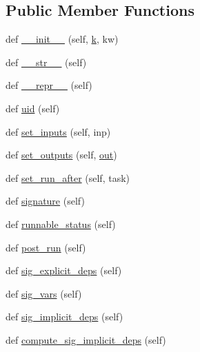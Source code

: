 \subsection*{Public Member Functions}
\begin{DoxyCompactItemize}
\item 
def \hyperlink{classwaflib_1_1_task_1_1_task_a566ab609bec4499aeab7bcd6f77f156e}{\+\_\+\+\_\+init\+\_\+\+\_\+} (self, \hyperlink{rfft2d_test_m_l_8m_adc468c70fb574ebd07287b38d0d0676d}{k}, kw)
\item 
def \hyperlink{classwaflib_1_1_task_1_1_task_a2507ae71718d699910a9dd8708664630}{\+\_\+\+\_\+str\+\_\+\+\_\+} (self)
\item 
def \hyperlink{classwaflib_1_1_task_1_1_task_ac05a045661750df307593224089759da}{\+\_\+\+\_\+repr\+\_\+\+\_\+} (self)
\item 
def \hyperlink{classwaflib_1_1_task_1_1_task_a910c51ea67c1c47ac40690bbba73b76a}{uid} (self)
\item 
def \hyperlink{classwaflib_1_1_task_1_1_task_a647c971bbca84d07daeff8d24f70ea18}{set\+\_\+inputs} (self, inp)
\item 
def \hyperlink{classwaflib_1_1_task_1_1_task_a8e650ed64c8370720574ebd8481a4f48}{set\+\_\+outputs} (self, \hyperlink{latency_8c_a71fd1c281affec034757279e4f91c50b}{out})
\item 
def \hyperlink{classwaflib_1_1_task_1_1_task_a84292828c5a6cf3282027ed8ce5c7822}{set\+\_\+run\+\_\+after} (self, task)
\item 
def \hyperlink{classwaflib_1_1_task_1_1_task_a48e55f13de8172b779a4e63794c7f44f}{signature} (self)
\item 
def \hyperlink{classwaflib_1_1_task_1_1_task_a2a281aaea77a0732f72103cfe4bc56c4}{runnable\+\_\+status} (self)
\item 
def \hyperlink{classwaflib_1_1_task_1_1_task_ac7c2e0bf22acd7d96399b1ca7f342232}{post\+\_\+run} (self)
\item 
def \hyperlink{classwaflib_1_1_task_1_1_task_a76a53025fb59fd6096f988ff64481070}{sig\+\_\+explicit\+\_\+deps} (self)
\item 
def \hyperlink{classwaflib_1_1_task_1_1_task_acffd01af005b390787b85239ac207282}{sig\+\_\+vars} (self)
\item 
def \hyperlink{classwaflib_1_1_task_1_1_task_a60ce159ef323481b09fcea4decb9e231}{sig\+\_\+implicit\+\_\+deps} (self)
\item 
def \hyperlink{classwaflib_1_1_task_1_1_task_adf3f63ea77fbca592ebc4244ba57887d}{compute\+\_\+sig\+\_\+implicit\+\_\+deps} (self)

\end{DoxyCompactItemize}
